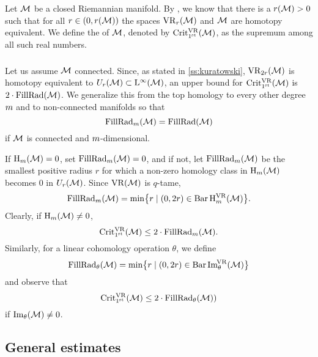 \subsubsection{}\label{ss:first_critical_value}

Let \(\cM\) be a closed Riemannian manifold.
By \cite[Thm.3.5]{hausmann1995vietoris}, we know that there is a \(r(\cM) > 0\) such that for all \(r \in (0,r(\cM))\) the spaces \(\VR_r(\cM)\) and \(\cM\) are homotopy equivalent.
We define the  of \(\cM\), denoted by \(\crit(\cM)\), as the supremum among all such real numbers.


\subsubsection{}

Let us assume \(\cM\) connected.
Since, as stated in \cref{ss:kuratowski}, \(\VR_{2r}(\cM)\) is homotopy equivalent to \(U_r(\cM) \subset \rL^\infty(\cM)\), an upper bound for \(\crit(\cM)\) is \(2\cdot\fillrad(\cM)\).
We generalize this from the top homology to every other degree \(\degp\) and to non-connected manifolds so that
\[
\fillrad_\degp(\cM) = \fillrad(\cM)
\]
if \(\cM\) is connected and \(\degp\)-dimensional.

If \(\rH_\degp(\cM) = 0\), set \(\fillrad_m(\cM) = 0\), and if not, let \(\fillrad_m(\cM)\) be the smallest positive radius $r$ for which a non-zero homology class in \(\rH_\degp(\cM)\) becomes \(0\) in \(U_r(\cM)\).
Since \(\VR(\cM)\) is \(q\)-tame,
\[
\fillrad_m(\cM) = \min\set[\big]{r \mid (0, 2r) \in \barc \rH^{\VR}_m(\cM)}.
\]
Clearly, if \(\rH_m(\cM) \neq 0\),
\[
\crit(\cM) \leq 2 \cdot \fillrad_m(\cM).
\]
Similarly, for a linear cohomology operation \(\theta\), we define
\[
\fillrad_\theta(\cM) = \min\set[\big]{r \mid (0, 2r) \in \barc \img_\theta^{\!\VR}(\cM)}
\]
and observe that
\[
\crit(\cM) \leq 2 \cdot \fillrad_\theta(\cM))
\]
if \(\img_\theta(\cM) \neq 0\).


\subsection{General estimates}\label{ss:barcode_general}

